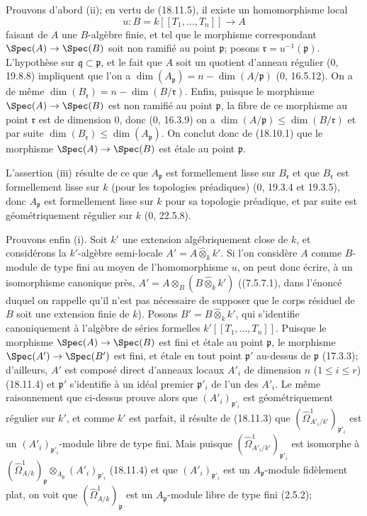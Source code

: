 Prouvons d'abord (ii); en vertu de (18.11.5), il existe un homomorphisme local
\[
  u:B=k[[T_1,\ldots,T_n]]\longrightarrow A
\]
faisant de $A$ une $B$-algèbre finie, et tel que le morphisme correspondant $\Spec(A)\to\Spec(B)$ soit non ramifié au point $\mathfrak p$; posons $\mathfrak r=u^{-1}(\mathfrak p)$. L'hypothèse sur $\mathfrak q\subset\mathfrak p$, et le fait que $A$ soit un quotient d'anneau régulier (0, 19.8.8) impliquent que l'on a $\dim(A_{\mathfrak p})=n-\dim(A/\mathfrak p)$ (0, 16.5.12). On a de même $\dim(B_{\mathfrak r})=n-\dim(B/\mathfrak r)$. Enfin, puisque le morphisme $\Spec(A)\to\Spec(B)$ est non ramifié au point $\mathfrak p$, la fibre de ce morphisme au point $\mathfrak r$ est de dimension 0, donc (0, 16.3.9) on a $\dim(A/\mathfrak p)\leq\dim(B/\mathfrak r)$ et par suite $\dim(B_{\mathfrak r})\leq\dim(A_{\mathfrak p})$. On conclut donc de (18.10.1) que le morphisme $\Spec(A)\to\Spec(B)$ est étale au point $\mathfrak p$.

L'assertion (iii) résulte de ce que $A_{\mathfrak p}$ est formellement lisse sur $B_{\mathfrak r}$ et que $B_{\mathfrak r}$ est formellement lisse sur $k$ (pour les topologies préadiques) (0, 19.3.4 et 19.3.5), donc $A_{\mathfrak p}$ est formellement lisse sur $k$ pour sa topologie préadique, et par suite est géométriquement régulier sur $k$ (0, 22.5.8).

Prouvons enfin (i). Soit $k'$ une extension algébriquement close de $k$, et considérons la $k'$-algèbre semi-locale $A'=A\widehat{\otimes}_k k'$. Si l'on considère $A$ comme $B$-module de type fini au moyen de l'homomorphisme $u$, on peut donc écrire, à un isomorphisme canonique près, $A'=A\otimes_B(B\widehat{\otimes}_k k')$ ((7.5.7.1), dans l'énoncé duquel on rappelle qu'il n'est pas nécessaire de supposer que le corps résiduel de $B$ soit une extension finie de $k$). Posons $B'=B\widehat{\otimes}_k k'$, qui s'identifie canoniquement à l'algèbre de séries formelles $k'[[T_1,\ldots,T_n]]$. Puisque le morphisme $\Spec(A)\to\Spec(B)$ est fini et étale au point $\mathfrak p$, le morphisme $\Spec(A')\to\Spec(B')$ est fini, et étale en tout point $\mathfrak p'$ au-dessus de $\mathfrak p$ (17.3.3); d'ailleurs, $A'$ est composé direct d'anneaux locaux $A'_i$ de dimension $n$ ($1\leq i\leq r$) (18.11.4) et $\mathfrak p'$ s'identifie à un idéal premier $\mathfrak p'_i$ de l'un des $A'_i$. Le même raisonnement que ci-dessus prouve alors que $(A'_i)_{\mathfrak p'_i}$ est géométriquement régulier sur $k'$, et comme $k'$ est parfait, il résulte de (18.11.3) que $(\hat{\Omega}^1_{A'_i/k'})_{\mathfrak p'_i}$ est un $(A'_i)_{\mathfrak p'_i}$-module libre de type fini. Mais puisque $(\hat{\Omega}^1_{A'_i/k'})_{\mathfrak p'_i}$ est isomorphe à $(\hat{\Omega}^1_{A/k})_{\mathfrak p}\otimes_{A_{\mathfrak p}}(A'_i)_{\mathfrak p'_i}$ (18.11.4) et que $(A'_i)_{\mathfrak p'_i}$ est un $A_{\mathfrak p}$-module fidèlement plat, on voit que $(\hat{\Omega}^1_{A/k})_{\mathfrak p}$ est un $A_{\mathfrak p}$-module libre de type fini (2.5.2);

